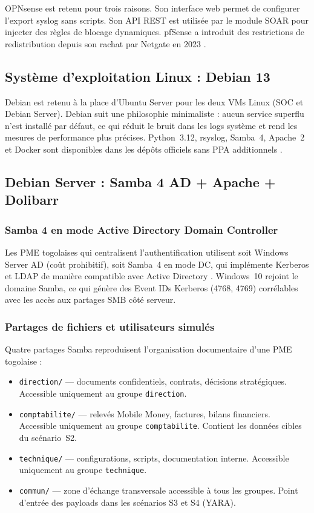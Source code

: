 \documentclass[12pt,a4paper]{article}
\begin{document}
OPNsense est retenu pour trois raisons. Son interface web permet de
configurer l'export syslog sans scripts. Son API REST est utilisée par
le module SOAR pour injecter des règles de blocage dynamiques. pfSense
a introduit des restrictions de redistribution depuis son rachat par
Netgate en 2023 \cite{pfsense_netgate}.

\subsection{Système d'exploitation Linux : Debian 13}

Debian est retenu à la place d'Ubuntu Server pour les deux VMs Linux
(SOC et Debian Server). Debian suit une philosophie minimaliste : aucun
service superflu n'est installé par défaut, ce qui réduit le bruit dans
les logs système et rend les mesures de performance plus précises.
Python~3.12, rsyslog, Samba~4, Apache~2 et Docker sont disponibles dans
les dépôts officiels sans PPA additionnels \cite{debian_stable}.

\subsection{Debian Server : Samba 4 AD + Apache + Dolibarr}

\subsubsection{Samba 4 en mode Active Directory Domain Controller}

Les PME togolaises qui centralisent l'authentification utilisent soit
Windows Server AD (coût prohibitif), soit Samba~4 en mode DC, qui
implémente Kerberos et LDAP de manière compatible avec Active Directory
\cite{samba4_ad}. Windows~10 rejoint le domaine Samba, ce qui génère des
Event IDs Kerberos (4768, 4769) corrélables avec les accès aux partages
SMB côté serveur.

\subsubsection{Partages de fichiers et utilisateurs simulés}

Quatre partages Samba reproduisent l'organisation documentaire d'une PME
togolaise :

\begin{itemize}
    \item \texttt{direction/} — documents confidentiels, contrats,
    décisions stratégiques. Accessible uniquement au groupe
    \texttt{direction}.
    \item \texttt{comptabilite/} — relevés Mobile Money, factures,
    bilans financiers. Accessible uniquement au groupe
    \texttt{comptabilite}. Contient les données cibles du scénario~S2.
    \item \texttt{technique/} — configurations, scripts, documentation
    interne. Accessible uniquement au groupe \texttt{technique}.
    \item \texttt{commun/} — zone d'échange transversale accessible
    à tous les groupes. Point d'entrée des payloads dans les
    scénarios S3 et S4 (YARA).
\end{itemize}
\end{document}
